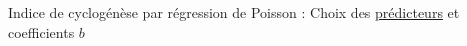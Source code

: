 \documentclass[aspectratio=169, usepdftitle=false, xcolor={dvipsnames}, 9pt,table]{beamer}
\begin{document}
\begin{frame}[c]
\begin{definition}
\begin{itemize}
        \end{itemize} 
    \end{definition}
    \vspace{1em}
    \begin{center}
        \small
        Indice de cyclogénèse par régression de Poisson : Choix des \underline{\alert{prédicteurs}} et \alert{coefficients} $b$
    \end{center}
\end{frame}

\end{document}
